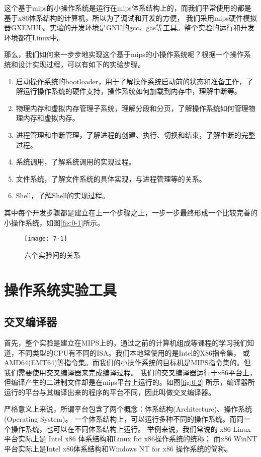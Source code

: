这个基于mips的小操作系统是运行在mips体系结构上的，而我们平常使用的都是基于x86体系结构的计算机，所以为了调试和开发的方便，
我们采用mips硬件模拟器GXEMUL。实验的开发环境是GNU的gcc、gas等工具。整个实验的运行和开发环境都在Linux中。

那么，我们如何来一步步地实现这个基于mips的小操作系统呢？根据一个操作系统和设计实现过程，可以有如下的实验步骤。
\begin{enumerate}
  \item 启动操作系统的bootloader，用于了解操作系统启动前的状态和准备工作，了解运行操作系统的硬件支持，操作系统如何加载到内存中，理解中断等。
  \item 物理内存和虚拟内存管理子系统，理解分段和分页，了解操作系统如何管理物理内存和虚拟内存。
  \item 进程管理和中断管理，了解进程的创建、执行、切换和结束，了解中断的完整过程。
  \item 系统调用，了解系统调用的实现过程。
  \item 文件系统，了解文件系统的具体实现，与进程管理等的关系。
  \item Shell，了解Shell的实现过程。
\end{enumerate}
其中每个开发步骤都是建立在上一个步骤之上，一步一步最终形成一个比较完善的小操作系统，如图\ref{fig:0-1}所示。

\begin{figure}[htbp]
  \centering
  \texttt{[image: 7-1]}
  \caption{六个实验间的关系}\label{fig:7-1}
\end{figure}

\section{操作系统实验工具}

\subsection{交叉编译器}
首先，整个实验是建立在MIPS上的，通过之前的计算机组成等课程的学习我们知道，不同类型的CPU有不同的ISA。我们本地常使用的是Intel的X86指令集，
或AMD64(EMT64)等指令集。而我们的小操作系统的目标机是MIPS指令集的。但我们需要使用交叉编译器来完成编译过程。
我们的交叉编译器运行于x86平台上，但编译产生的二进制文件却是在mips平台上运行的。如图\ref{fig:0-2}
所示，编译器所运行的平台与其编译出来的程序的平台不同，因此叫做交叉编译器。

\begin{note}
严格意义上来说，所谓平台包含了两个概念：体系结构(Architecture)、操作系统(Operating System)。
一个体系结构上，可以运行多种不同的操作系统。而同一个操作系统，也可以在不同体系结构上运行。
举例来说，我们常说的 x86 Linux 平台实际上是 Intel x86 体系结构和Linux for x86操作系统的统称；
而x86 WinNT平台实际上是Intel x86体系结构和Windows NT for x86 操作系统的简称。
\end{note}


